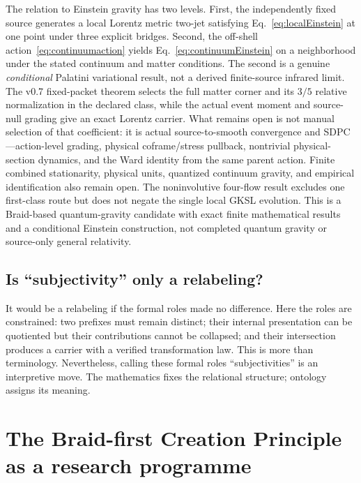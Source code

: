 \documentclass[11pt]{article}
\theoremstyle{definition}
\theoremstyle{remark}
\begin{document}
The relation to Einstein gravity has two levels. First, the independently fixed source generates a local Lorentz metric two-jet satisfying Eq.~\eqref{eq:localEinstein} at one point under three explicit bridges. Second, the off-shell action~\eqref{eq:continuumaction} yields Eq.~\eqref{eq:continuumEinstein} on a neighborhood under the stated continuum and matter conditions. The second is a genuine \emph{conditional} Palatini variational result, not a derived finite-source infrared limit. The v0.7 fixed-packet theorem selects the full matter corner and its $3/5$ relative normalization in the declared class, while the actual event moment and source-null grading give an exact Lorentz carrier. What remains open is not manual selection of that coefficient: it is actual source-to-smooth convergence and SDPC---action-level grading, physical coframe/stress pullback, nontrivial physical-section dynamics, and the Ward identity from the same parent action. Finite combined stationarity, physical units, quantized continuum gravity, and empirical identification also remain open. The noninvolutive four-flow result excludes one first-class route but does not negate the single local GKSL evolution. This is a Braid-based quantum-gravity candidate with exact finite mathematical results and a conditional Einstein construction, not completed quantum gravity or source-only general relativity.

\subsection{Is ``subjectivity'' only a relabeling?}

It would be a relabeling if the formal roles made no difference. Here the roles are constrained: two prefixes must remain distinct; their internal presentation can be quotiented but their contributions cannot be collapsed; and their intersection produces a carrier with a verified transformation law. This is more than terminology. Nevertheless, calling these formal roles ``subjectivities'' is an interpretive move. The mathematics fixes the relational structure; ontology assigns its meaning.

\section{The Braid-first Creation Principle as a research programme}
\end{document}
